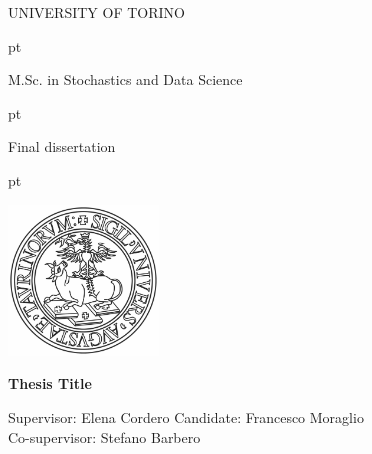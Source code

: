 \documentclass[%
    corpo=11pt,
    twoside,
    stile=classica,
    oldstyle,
    autoretitolo,
    tipotesi=magistrale,
    greek,
    evenboxes,
    english
]{toptesi}
\begin{document}

\thispagestyle{empty}

\centerline {\huge{\textsc{UNIVERSITY OF TORINO}}}
 pt

%
%
%
%
%
%
\centerline {\LARGE{\textsc M.Sc. in Stochastics and Data Science}}
 pt

\centerline {\Large{\textsc Final dissertation}}
 pt





\centerline {\includegraphics[width=4cm]{logounito.pdf}}

\vskip 1cm


\vskip 0.7cm

\begin{center} %
\Large \bf Thesis Title\\

\end{center}

\vskip 1.7cm
\large
\noindent  Supervisor: Elena Cordero  \hfill  {Candidate: Francesco Moraglio}\\
\noindent Co-supervisor: Stefano Barbero




\vskip 2.5cm
\end{document}
